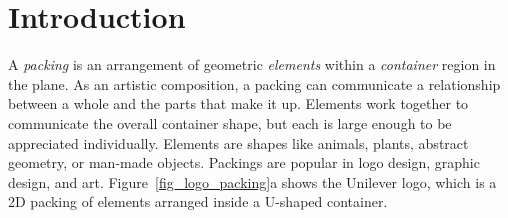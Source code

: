 
\chapter{Introduction}
\label{chapter_introduction}







\newtext
{
A \textit{packing} is an arrangement of geometric
\textit{elements} within a \textit{container} region in the plane.
As an artistic composition, 
a packing can communicate a relationship between a whole and the parts that make it up.
Elements work together to communicate the overall container shape,
but each is large enough to be appreciated individually.
Elements are shapes like animals, plants, abstract geometry, or man-made objects.
Packings are popular in logo design, graphic design, and art.
Figure~\ref{fig_logo_packing}a shows the Unilever logo,
which is a 2D packing of elements arranged inside a U-shaped container.}

